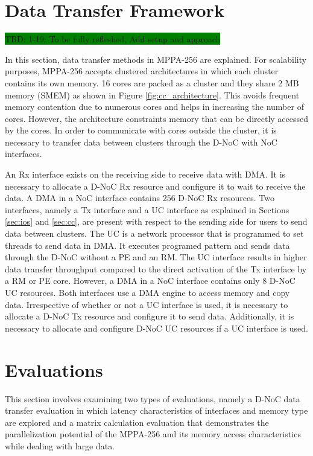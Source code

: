 \documentclass[conference,compsoc]{IEEEtran}
\begin{document}
\section{Data Transfer Framework}
\label{sec:framework}
\colorbox{green}{TBD: 1-19: To be fully refleshed, Add setup and approach}

In this section, data transfer methods in MPPA-256 are explained.
For scalability purposes, MPPA-256 accepts clustered architectures in which each cluster contains its own memory.
16 cores are packed as a cluster and they share 2 MB memory (SMEM) as shown in Figure \ref{fig:cc_architecture}.
This avoids frequent memory contention due to numerous cores and helps in increasing the number of cores.
However, the architecture constraints memory that can be directly accessed by the cores.
In order to communicate with cores outside the cluster, it is necessary to transfer data between clusters through the D-NoC with NoC interfaces.

An Rx interface exists on the receiving side to receive data with DMA.
It is necessary to allocate a D-NoC Rx resource and configure it to wait to receive the data.
A DMA in a NoC interface contains 256 D-NoC Rx resources.
Two interfaces, namely a Tx interface and a UC interface as explained in Sections \ref{sec:ios} and \ref{sec:cc},
are present with respect to the sending side for users to send data between clusters.
The UC is a network processor that is programmed to set threads to send data in DMA.
It executes programed pattern and sends data through the D-NoC without a PE and an RM.
The UC interface results in higher data transfer throughput compared to the direct activation of the Tx interface by a RM or PE core.
However, a DMA in a NoC interface contains only 8 D-NoC UC resources.
Both interfaces use a DMA engine to access memory and copy data.
Irrespective of whether or not a UC interface is used, it is necessary to allocate a D-NoC Tx resource and configure it to send data.
Additionally, it is necessary to allocate and configure D-NoC UC resources if a UC interface is used.


\section{Evaluations}
\label{sec:evaluations}
This section involves examining two types of evaluations, namely a D-NoC data transfer evaluation in which latency characteristics of interfaces and memory type are explored and a matrix calculation evaluation that demonstrates the parallelization potential of the MPPA-256 and its memory access characteristics while dealing with large data.
\end{document}

